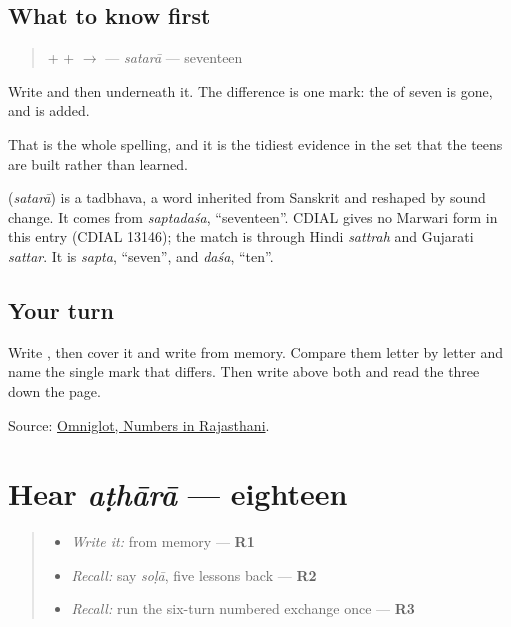\subsection*{What to know first}
\begin{quote}
\textbf{} + \textbf{} + \textbf{} $\to$ \textbf{} — \emph{satarā} — seventeen
\end{quote}

Write \textbf{} and then \textbf{} underneath it. The difference is one mark: the \textbf{} of seven is gone, and \textbf{} is added.

That is the whole spelling, and it is the tidiest evidence in the set that the teens are built rather than learned.

\begin{cousinweb}
\textbf{} (\emph{satarā}) is a tadbhava, a word inherited from Sanskrit and reshaped by sound change. It comes from \emph{saptadaśa}, \textquotedblleft{}seventeen\textquotedblright{}. CDIAL gives no Marwari form in this entry (CDIAL 13146); the match is through Hindi \emph{sattrah} and Gujarati \emph{sattar}. It is \emph{sapta}, \textquotedblleft{}seven\textquotedblright{}, and \emph{daśa}, \textquotedblleft{}ten\textquotedblright{}.
\end{cousinweb}

\subsection*{Your turn}
Write \textbf{}, then cover it and write \textbf{} from memory. Compare them letter by letter and name the single mark that differs. Then write \textbf{} above both and read the three down the page.

\begin{tcolorbox}[breakable,colback=teal!4,colframe=teal!35!black,title={Before you move on}]
Source: \href{https://www.omniglot.com/language/numbers/rajasthani.htm}{Omniglot, Numbers in Rajasthani}.
\end{tcolorbox}
\section[aṭhārā]{Hear \emph{aṭhārā} — eighteen}

\label{lesson:MW-C38-hear-athara}



\begin{quote}
\begin{itemize}
\raggedright
  \item \emph{Write it:} \textbf{} from memory — \textbf{R1}
  \item \emph{Recall:} say \emph{soḷā}, five lessons back — \textbf{R2}
  \item \emph{Recall:} run the six-turn numbered exchange once — \textbf{R3}
\end{itemize}
\end{quote}

